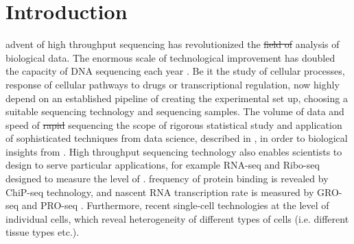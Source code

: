 \chapter{Introduction}
 advent of high throughput sequencing has revolutionized the \st{field of} analysis of biological data. The enormous scale of technological improvement has doubled the capacity of DNA sequencing each year \citep{reuter2015high}. Be it the study of cellular processes, response of cellular pathways to drugs or transcriptional regulation,  now highly depend on an established pipeline of creating the experimental set up, choosing a suitable sequencing technology  and sequencing  samples. The volume of data and speed of \st{rapid} sequencing  the scope of rigorous statistical study and  application of sophisticated techniques from data science,  described in \citep{schatz2015biological}, in order to  biological insights from . High throughput sequencing technology also enables scientists to design  to serve particular applications, for example RNA-seq \citep{mortazavi2008mapping} and Ribo-seq \citep{gerashchenko2012genome}  designed to measure the level of .   frequency of protein binding is revealed by ChiP-seq \citep{zhang2008model} technology, and nascent RNA transcription rate is measured by GRO-seq and PRO-seq \citep{core2008nascent} . Furthermore, recent single-cell technologies  at the level of individual cells, which reveal heterogeneity of different types of cells (i.e. different tissue types etc.). 

